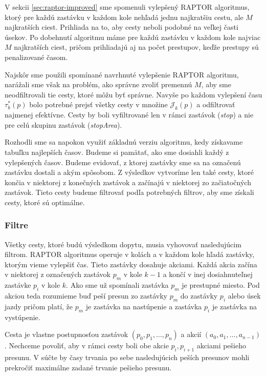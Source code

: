 V sekcii \ref{sec:raptor-improved} sme spomenuli vylepšený RAPTOR algoritmus, ktorý pre každú zastávku v každom kole nehľadá jednu najkratšiu cestu, ale $M$ najkratších ciest. Prihliada na to, aby cesty neboli podobné na veľkej časti úsekov. Po dobehnutí algoritmu máme pre každú zastávku v každom kole najviac $M$ najkratších ciest, pričom prihliadajú aj na počet prestupov, keďže prestupy sú penalizované časom.

Najskôr sme použili spomínané navrhnuté vylepšenie RAPTOR algoritmu, narážali sme však na problém, ako správne zvoliť premennú $M$, aby sme neodfiltrovali tie cesty, ktoré môžu byť správne. Navyše po každom vylepšení času $\tau^*_k(p)$ bolo potrebné prejsť všetky cesty v množine $\mathcal{J}_k(p)$ a odfiltrovať najmenej efektívne. Cesty by boli vyfiltrované len v rámci zastávok (\textit{stop}) a nie pre celú skupinu zastávok (\textit{stopArea}).

Rozhodli sme sa napokon využiť základnú verziu algoritmu, kedy získavame tabuľku najlepších časov. Budeme si pamätať, ako sme dosiahli každý z vylepšených časov. Budeme evidovať, z ktorej zastávky sme sa na označenú zastávku dostali a akým spôsobom. Z výsledkov vytvoríme len také cesty, ktoré končia v niektorej z konečných zastávok a začínajú v niektorej zo začiatočných zastávok. Tieto cesty budeme filtrovať podľa potrebných filtrov, aby sme získali cesty, ktoré sú optimálne. 

\subsubsection{Filtre}
Všetky cesty, ktoré budú výsledkom dopytu, musia vyhovovať nasledujúcim filtrom. RAPTOR algoritmus operuje v kolách a v každom kole hľadá zastávky, ktorým vieme vylepšiť čas. Tieto zastávky dosahuje akciami. Každá akcia začína v niektorej z označených zastávok $p_m$ v kole $k-1$ a končí v inej dosiahnuteľnej zastávke $p_i$ v kole $k$.  Ako sme už spomínali zastávka $p_m$ je prestupné miesto. Pod akciou teda rozumieme buď peší presun zo zastávky $p_m$ do zastávky $p_i$ alebo úsek jazdy pričom platí, že $p_m$ je zastávka na nastúpenie a zastávka $p_i$ je zastávka na vystúpenie.

Cesta je vlastne postupnosťou zastávok $(p_0, p_1, …, p_n)$ a akcií $(a_0, a_1, ..., a_{n-1})$. Nechceme povoliť, aby v rámci cesty boli obe akcie $p_i, p_{i+1}$ akciami pešieho presunu. V súčte by časy trvania po sebe nasledujúcich peších presunov mohli prekročiť maximálne zadané trvanie pešieho presunu. 

